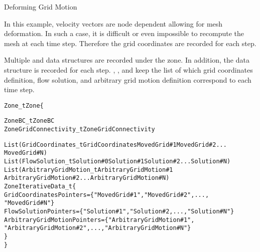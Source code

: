 \enlargethispage{\baselineskip}
\begin{example}{Deforming Grid Motion}
\label{ex:deformingmotion}

In this example, velocity vectors are node dependent allowing for mesh
deformation.
In such a case, it is difficult or even impossible to recompute the mesh
at each time step.
Therefore the grid coordinates are recorded for each step.

Multiple  and  data
structures are recorded under the zone.
In addition, the data structure  is recorded
for each step.
, , and
 keep the list of which grid
coordinates definition, flow solution, and arbitrary grid motion
definition correspond to each time step.

\begin{alltt}
  Zone\_t Zone \{

    ZoneBC\_t ZoneBC
    ZoneGridConnectivity\_t ZoneGridConnectivity

    List ( GridCoordinates\_t GridCoordinates MovedGrid\#1 MovedGrid\#2 ...
           MovedGrid\#N )
    List ( FlowSolution\_t Solution\#0 Solution\#1 Solution\#2 ... Solution\#N )
    List ( ArbitraryGridMotion\_t ArbitraryGridMotion\#1 
           ArbitraryGridMotion\#2 ... ArbitraryGridMotion\#N )
    ZoneIterativeData\_t \{
      GridCoordinatesPointers = \{"MovedGrid\#1", "MovedGrid\#2", ...,
         "MovedGrid\#N"\}
      FlowSolutionPointers = \{"Solution\#1", "Solution\#2, ..., "Solution\#N"\}
      ArbitraryGridMotionPointers = \{"ArbitraryGridMotion\#1",
         "ArbitraryGridMotion\#2", ..., "ArbitraryGridMotion\#N"\}
    \}
  \}
\end{alltt}
\end{example}

